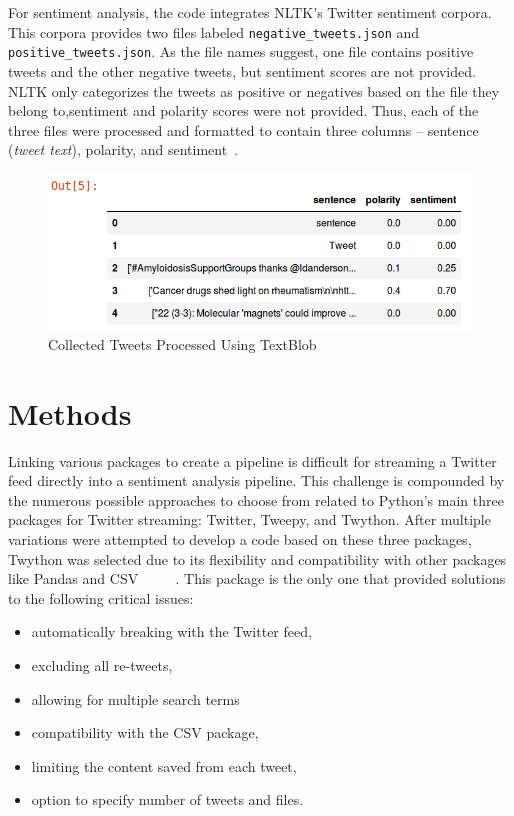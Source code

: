 For sentiment analysis, the code integrates NLTK's Twitter sentiment
corpora.  This corpora provides two files labeled
\verb|negative_tweets.json| and \verb|positive_tweets.json|.  As the
file names suggest, one file contains positive tweets and the other
negative tweets, but sentiment scores are not provided.  NLTK only
categorizes the tweets as positive or negatives based on the file they
belong to,sentiment and polarity scores were not provided.  Thus, each
of the three files were processed and formatted to contain three
columns -- sentence (\emph{tweet text}), polarity, and
sentiment~\cite{twitter_analysis}.

\begin{figure}[H]
\centering
\includegraphics[width=\columnwidth]{images/collected_tweets_head.png}
\caption{Collected Tweets Processed Using TextBlob}
\label{fig:textblob_tweets}
\end{figure} 

\section{Methods}

Linking various packages to create a pipeline is difficult for
streaming a Twitter feed directly into a sentiment analysis pipeline.
This challenge is compounded by the numerous possible approaches to
choose from related to Python's main three packages for Twitter
streaming: Twitter, Tweepy, and Twython.  After multiple variations
were attempted to develop a code based on these three packages,
Twython was selected due to its flexibility and compatibility with
other packages like Pandas and CSV~\cite{twitterU46}~\cite{clay2013}
~\cite{python37} ~\cite{python-csv}.  This package is the only one
that provided solutions to the following critical issues:

\begin{itemize}
\item automatically breaking with the Twitter feed,
\item excluding all re-tweets,
\item allowing for multiple search terms
\item compatibility with the CSV package,
\item limiting the content saved from each tweet,
\item option to specify number of tweets and files.
\end{itemize}

